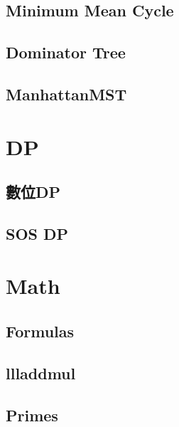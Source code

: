 \subsection{Minimum Mean Cycle}


\subsection{Dominator Tree}


\subsection{ManhattanMST}


\section{DP}

\subsection{數位DP}


\subsection{SOS DP}


\section{Math}

\subsection{Formulas}


\subsection{llladdmul}


\subsection{Primes}



